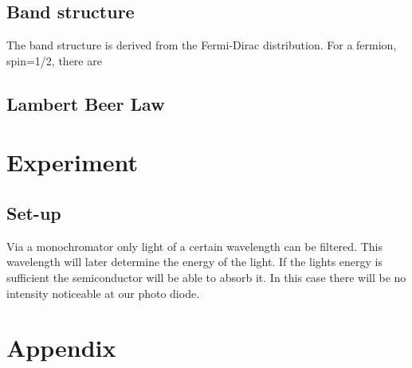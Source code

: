 \documentclass[]{article}
\begin{document}
\subsection{Band structure}
The band structure is derived from the Fermi-Dirac distribution. For a fermion, spin=1/2, there are


\subsection{Lambert Beer Law}


\section{Experiment}
\subsection{Set-up}

Via a monochromator only light of a certain wavelength can be filtered. This wavelength will later determine the energy of the light. If the lights energy is sufficient the semiconductor will be able to absorb it. In this case there will be no intensity noticeable at our photo diode. 


\section{Appendix}


\newpage
\begin{thebibliography}{}


\end{thebibliography}
\end{document}

